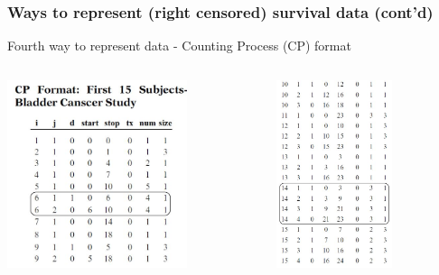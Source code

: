 \documentclass{beamer}
\theoremstyle{definition}
\begin{document}
\begin{frame}
\frametitle{Ways to represent (right censored) survival data (cont'd)}
\begin{block}{Fourth way to represent data - Counting Process (CP) format}
\begin{columns}
    \begin{column}{0.48\textwidth}
        \includegraphics[width =\textwidth, height=5.5cm]{Ch1-CPFormat_1.JPG}
    \end{column}
    \hspace{-10pt}
    \begin{column}{0.48\textwidth}
         \includegraphics[width =\textwidth, height=5.5cm]{Ch1-CPFormat_2.JPG}
    \end{column}
\end{columns}
\end{block}
\end{frame}
\end{document}
